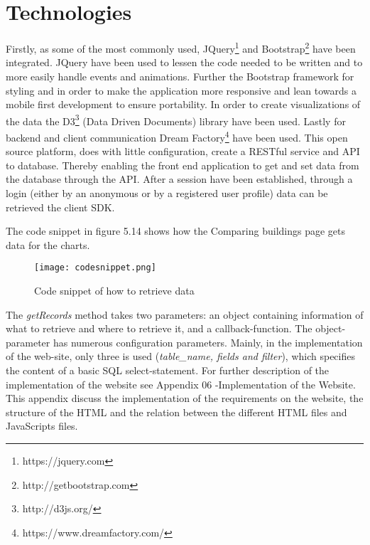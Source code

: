\section*{Technologies}
Firstly, as some of the most commonly used, JQuery\footnote{https://jquery.com} and Bootstrap\footnote{http://getbootstrap.com} have been integrated. JQuery have been used to lessen the code needed to be written and to more easily handle events and animations. Further the Bootstrap framework for styling and in order to make the application more responsive and lean towards a mobile first development to ensure portability.  
In order to create visualizations of the data the D3\footnote{http://d3js.org/} (Data Driven Documents) library have been used. Lastly for backend and client communication Dream Factory\footnote{https://www.dreamfactory.com/} have been used. This open source platform, does with little configuration, create a RESTful service and API to database. Thereby enabling the front end application to get and set data from the database through the API. 
After a session have been established, through a login (either by an anonymous or by a registered user profile) data can be retrieved the client SDK. 

The code snippet in figure 5.14 shows how the Comparing buildings page gets data for the charts.
\begin{figure}
\begin{center}
\texttt{[image: codesnippet.png]}
\end{center}
\caption{Code snippet of how to retrieve data}
\end{figure}
The \emph{getRecords} method takes two parameters: an object containing information of what to retrieve and where to retrieve it, and a callback-function.
The object-parameter has numerous configuration parameters. Mainly, in the implementation of the web-site, only three is used (\emph{table\_name, fields and filter}), which specifies the content of a basic SQL select-statement.
\newline
\newline
For further description of the implementation of the website see Appendix 06 -Implementation of the Website. This appendix discuss the implementation of the requirements on the website, the structure of the HTML and the relation between the different  HTML files and JavaScripts files.


